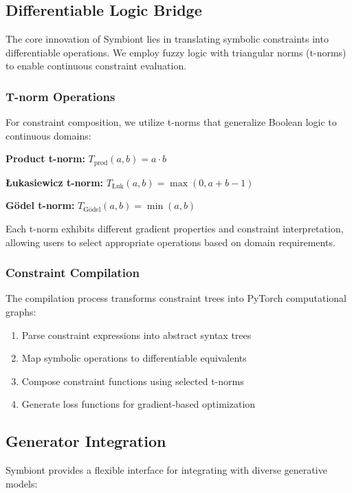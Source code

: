 \documentclass[conference]{IEEEtran}
\begin{document}
\subsection{Differentiable Logic Bridge}

The core innovation of Symbiont lies in translating symbolic constraints into differentiable operations. We employ fuzzy logic with triangular norms (t-norms) to enable continuous constraint evaluation.

\subsubsection{T-norm Operations}

For constraint composition, we utilize t-norms that generalize Boolean logic to continuous domains:

\textbf{Product t-norm:} $T_{\text{prod}}(a,b) = a \cdot b$

\textbf{Łukasiewicz t-norm:} $T_{\text{Łuk}}(a,b) = \max(0, a + b - 1)$

\textbf{Gödel t-norm:} $T_{\text{Gödel}}(a,b) = \min(a, b)$

Each t-norm exhibits different gradient properties and constraint interpretation, allowing users to select appropriate operations based on domain requirements.

\subsubsection{Constraint Compilation}

The compilation process transforms constraint trees into PyTorch computational graphs:

\begin{enumerate}
    \item Parse constraint expressions into abstract syntax trees
    \item Map symbolic operations to differentiable equivalents
    \item Compose constraint functions using selected t-norms
    \item Generate loss functions for gradient-based optimization
\end{enumerate}

\subsection{Generator Integration}

Symbiont provides a flexible interface for integrating with diverse generative models:
\end{document}
